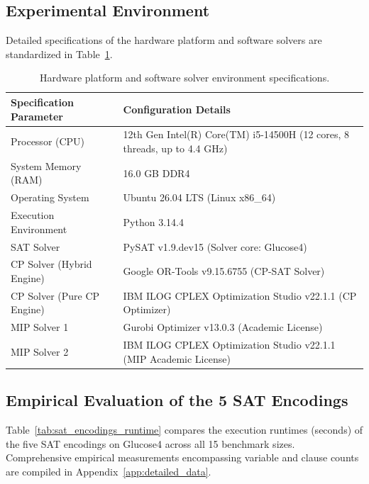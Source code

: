 \documentclass[a4paper,fleqn]{cas-sc}
\begin{document}
\subsection{Experimental Environment}
\label{subsec:exp_env}
Detailed specifications of the hardware platform and software solvers are standardized in Table~\ref{tab:env_config}.

\begin{table}[pos=htbp]
\centering
\caption{Hardware platform and software solver environment specifications.}
\label{tab:env_config}
\begin{tabularx}{\textwidth}{>{\raggedright\arraybackslash}p{4.8cm} X}
\toprule
\textbf{Specification Parameter} & \textbf{Configuration Details} \\
\midrule
Processor (CPU) & 12th Gen Intel(R) Core(TM) i5-14500H (12 cores, 8 threads, up to 4.4 GHz) \\
System Memory (RAM) & 16.0 GB DDR4 \\
Operating System & Ubuntu 26.04 LTS (Linux x86\_64) \\
Execution Environment & Python 3.14.4 \\
SAT Solver & PySAT v1.9.dev15 (Solver core: Glucose4) \\
CP Solver (Hybrid Engine) & Google OR-Tools v9.15.6755 (CP-SAT Solver) \\
CP Solver (Pure CP Engine) & IBM ILOG CPLEX Optimization Studio v22.1.1 (CP Optimizer) \\
MIP Solver 1 & Gurobi Optimizer v13.0.3 (Academic License) \\
MIP Solver 2 & IBM ILOG CPLEX Optimization Studio v22.1.1 (MIP Academic License) \\
\bottomrule
\end{tabularx}
\end{table}

\subsection{Empirical Evaluation of the 5 SAT Encodings}
\label{subsec:sat_enc_results}
Table~\ref{tab:sat_encodings_runtime} compares the execution runtimes (seconds) of the five SAT encodings on Glucose4 across all 15 benchmark sizes. Comprehensive empirical measurements encompassing variable and clause counts are compiled in Appendix~\ref{app:detailed_data}.
\end{document}
